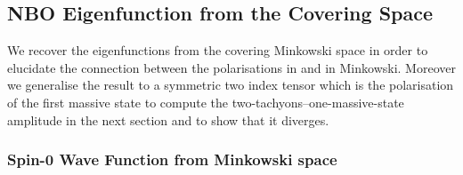 \subsection{NBO Eigenfunction from the Covering Space}
\label{sec:Eigenmodes_from_Covering}

We recover the eigenfunctions from the covering Minkowski space in order to elucidate the connection between the polarisations in \nbo and in Minkowski.
Moreover we generalise the result to a symmetric two index tensor which is the polarisation of the first massive state to compute the two-tachyons--one-massive-state amplitude in the next section and to show that it diverges.


\subsubsection{Spin-0 Wave Function from Minkowski space}

